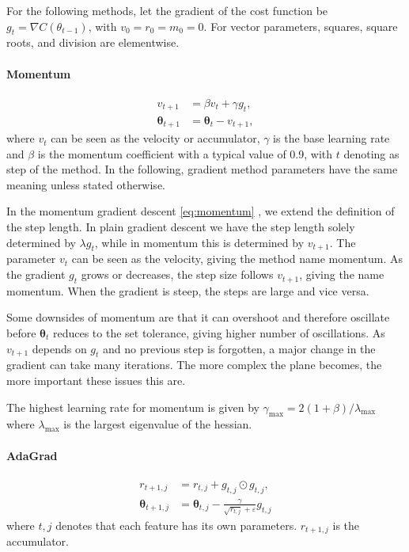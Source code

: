 \documentclass[reprint,english,notitlepage]{revtex4-2}  %
\begin{document}
For the following methods, let the gradient of the cost function be \(g_t = \nabla C(\theta_{t-1})\), with \(v_0 = r_0 = m_0 = 0\). For vector parameters, squares, square roots, and division are elementwise.

\paragraph{Momentum}
\begin{equation}
\begin{aligned}
v_{t+1} &= \beta v_{t} + \gamma g_t, \\
\bm{\theta}_{t + 1} &= \bm{\theta}_t - v_{t+1},
\end{aligned}
\label{eq:momentum}
\end{equation}
where $v_t$ can be seen as the velocity or accumulator, $\gamma$ is the base learning rate and $\beta$ is the momentum coefficient with a typical value of 0.9, with $t$ denoting as step of the method. In the following, gradient method parameters have the same meaning unless stated otherwise. 

In the momentum gradient descent \eqref{eq:momentum} \cite{addition_w38}, we extend the definition of the step length. In plain gradient descent we have the step length solely determined by $\lambda g_t$, while in momentum this is determined by $v_{t+1}$. The parameter $v_t$ can be seen as the velocity, giving the method name momentum. As the gradient $g_t$ grows or decreases, the step size follows $v_{t+1}$, giving the name momentum. When the gradient is steep, the steps are large and vice versa.

Some downsides of momentum are that it can overshoot and therefore oscillate before $\bm{\theta}_t$ reduces to the set tolerance, giving higher number of oscillations.  As $v_{t+1}$ depends on $g_t$ and no previous step is forgotten, a major change in the gradient can take many iterations. The more complex the plane becomes, the more important these issues this are.

The highest learning rate for momentum is given by $\gamma_\text{max} = 2(1+\beta)/\lambda_\text{max}$ where $\lambda_\text{max}$ is the largest eigenvalue of the hessian.

\paragraph{AdaGrad}
\begin{equation}
\begin{aligned}
r_{t+1,j} &= r_{t,j} + g_{t,j} \odot g_{t,j}, \\
\bm{\theta}_{t+1,j} &= \bm{\theta}_{t,j}
 -  \frac{\gamma}{\sqrt{r_{t,j}}+\varepsilon}g_{t,j}
\end{aligned}
\label{eq:adagrad}
\end{equation}
where $t,j$ denotes that each feature has its own parameters. $r_{t+1,j}$ is the accumulator. 
\end{document}
